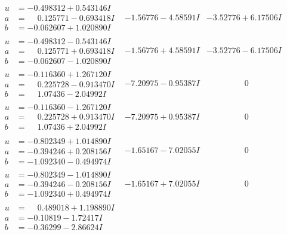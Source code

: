 \documentclass[1p]{elsarticle_modified}
\theoremstyle{definition}
\begin{document}
$$\begin{array}{c|c|c}
 \hline 
\begin{aligned}
u &= -0.498312 + 0.543146 I \\
a &= \phantom{-}0.125771 - 0.693418 I \\
b &= -0.062607 + 1.020890 I\end{aligned}
 & -1.56776 - 4.58591 I & -3.52776 + 6.17506 I \\ \hline\begin{aligned}
u &= -0.498312 - 0.543146 I \\
a &= \phantom{-}0.125771 + 0.693418 I \\
b &= -0.062607 - 1.020890 I\end{aligned}
 & -1.56776 + 4.58591 I & -3.52776 - 6.17506 I \\ \hline\begin{aligned}
u &= -0.116360 + 1.267120 I \\
a &= \phantom{-}0.225728 - 0.913470 I \\
b &= \phantom{-}1.07436 - 2.04992 I\end{aligned}
 & -7.20975 - 0.95387 I & \phantom{-0.000000 } 0 \\ \hline\begin{aligned}
u &= -0.116360 - 1.267120 I \\
a &= \phantom{-}0.225728 + 0.913470 I \\
b &= \phantom{-}1.07436 + 2.04992 I\end{aligned}
 & -7.20975 + 0.95387 I & \phantom{-0.000000 } 0 \\ \hline\begin{aligned}
u &= -0.802349 + 1.014890 I \\
a &= -0.394246 + 0.208156 I \\
b &= -1.092340 - 0.494974 I\end{aligned}
 & -1.65167 - 7.02055 I & \phantom{-0.000000 } 0 \\ \hline\begin{aligned}
u &= -0.802349 - 1.014890 I \\
a &= -0.394246 - 0.208156 I \\
b &= -1.092340 + 0.494974 I\end{aligned}
 & -1.65167 + 7.02055 I & \phantom{-0.000000 } 0 \\ \hline\begin{aligned}
u &= \phantom{-}0.489018 + 1.198890 I \\
a &= -0.10819 - 1.72417 I \\
b &= -0.36299 - 2.86624 I\end{aligned}

\end{array}$$
\end{document}
